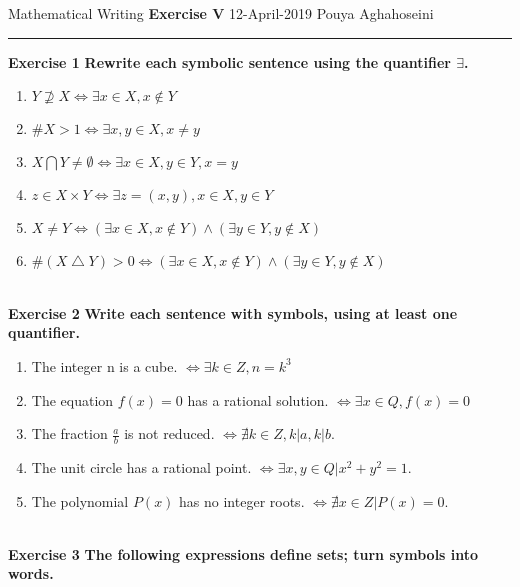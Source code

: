 \documentclass{article}
\begin{document}
\noindent
Mathematical Writing \hfill \textbf{Exercise V} \newline 
{12-April-2019} \hfill Pouya Aghahoseini

\noindent
\rule{\linewidth}{0.4pt}
\textbf{\large\color{blue} Exercise 1}   \textbf{Rewrite each symbolic sentence using the quantifier $\exists$.}

	\begin{enumerate}
		\item $Y \nsupseteq X \Leftrightarrow \exists x \in X, x \notin Y $
		\item $ \# X>1 \Leftrightarrow \exists x,y \in X, x \neq y $
		\item $ X \bigcap Y \neq \emptyset \Leftrightarrow \exists x \in X,y \in Y, x=y $
		\item $ z \in X \times Y \Leftrightarrow \exists z =(x,y) , x\in X,y \in Y $
		\item $ X \neq Y \Leftrightarrow (\exists x\in X, x \notin Y) \wedge (\exists y\in Y, y \notin X) $
		\item $ \# (X \bigtriangleup Y)>0 \Leftrightarrow (\exists x\in X, x \notin Y) \wedge (\exists y\in Y, y \notin X) $
	\end{enumerate}
	
\text{}\\
\textbf{\large\color{blue} Exercise 2} \textbf{Write each sentence with symbols, using at least one quantifier.}

\begin{enumerate}
	\item 
	The integer n is a cube. $ \Leftrightarrow \exists k \in Z, n=k^{3} $
	\item 
	The equation $f(x)=0$ has a rational solution. $ \Leftrightarrow \exists x \in Q, f(x)=0 $
	\item 
	The fraction $\frac{a}{b}$ is not reduced. $ \Leftrightarrow \nexists k \in Z, k|a , k|b$.
	\item 
	The unit circle has a rational point. $ \Leftrightarrow \exists x,y \in Q | x^{2} + y^{2} = 1$.
	\item 
	The polynomial $P(x)$ has no integer roots. $ \Leftrightarrow \nexists x \in Z | P(x) = 0 $.
\end{enumerate}
\text{}\\
\textbf{\large\color{blue} Exercise 3} \textbf{The following expressions define sets; turn symbols
	into words.}
\end{document}
